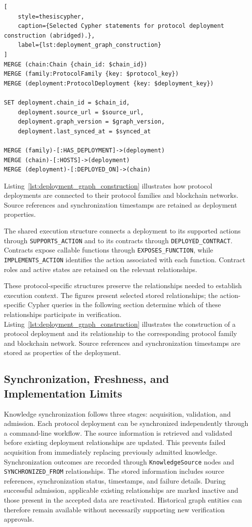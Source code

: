 \begin{lstlisting}[
    style=thesiscypher,
    caption={Selected Cypher statements for protocol deployment construction (abridged).},
    label={lst:deployment_graph_construction}
]
MERGE (chain:Chain {chain_id: $chain_id})
MERGE (family:ProtocolFamily {key: $protocol_key})
MERGE (deployment:ProtocolDeployment {key: $deployment_key})

SET deployment.chain_id = $chain_id,
    deployment.source_url = $source_url,
    deployment.graph_version = $graph_version,
    deployment.last_synced_at = $synced_at

MERGE (family)-[:HAS_DEPLOYMENT]->(deployment)
MERGE (chain)-[:HOSTS]->(deployment)
MERGE (deployment)-[:DEPLOYED_ON]->(chain)
\end{lstlisting}


Listing~\ref{lst:deployment_graph_construction}
illustrates how protocol deployments are connected to
their protocol families and blockchain networks.
Source references and synchronization timestamps
are retained as deployment properties.


The shared execution structure connects a deployment to
its supported actions through \texttt{SUPPORTS\_ACTION}
and to its contracts through \texttt{DEPLOYED\_CONTRACT}.
Contracts expose callable functions through
\texttt{EXPOSES\_FUNCTION}, while
\texttt{IMPLEMENTS\_ACTION} identifies the action
associated with each function. Contract roles and active
states are retained on the relevant relationships.

These protocol-specific structures preserve the relationships
needed to establish execution context. The figures present
selected stored relationships; the action-specific Cypher
queries in the following section determine which of these
relationships participate in verification.
Listing~\ref{lst:deployment_graph_construction}
illustrates the construction of a protocol deployment
and its relationship to the corresponding protocol
family and blockchain network. Source references and
synchronization timestamps are stored as properties
of the deployment.

\subsection{Synchronization, Freshness, and Implementation Limits}

Knowledge synchronization follows three stages:
acquisition, validation, and admission. Each protocol
deployment can be synchronized independently through
a command-line workflow. The source information is
retrieved and validated before existing deployment
relationships are updated. This prevents failed acquisition
from immediately replacing previously admitted knowledge. Synchronization outcomes are recorded through
\texttt{KnowledgeSource} nodes and
\texttt{SYNCHRONIZED\_FROM} relationships. The stored
information includes source references, synchronization
status, timestamps, and failure details. During successful
admission, applicable existing relationships are marked
inactive and those present in the accepted data are
reactivated. Historical graph entities can therefore
remain available without necessarily supporting new
verification approvals.

